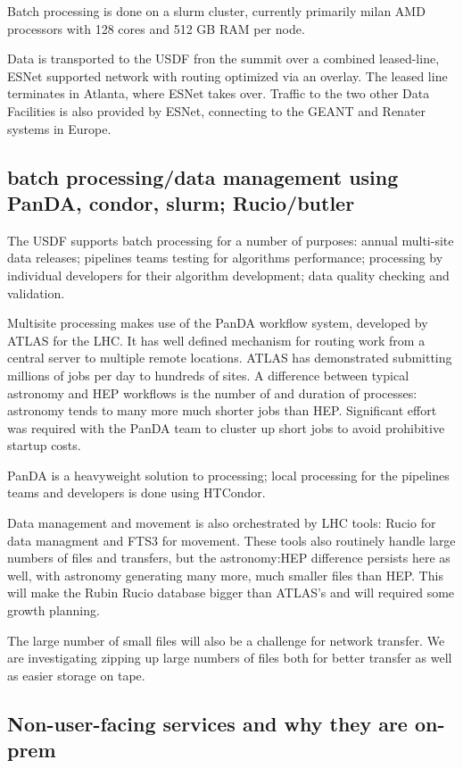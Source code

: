 Batch processing is done on a slurm cluster, currently primarily milan AMD
processors with 128 cores and 512 GB RAM per node.

Data is transported to the USDF fron the summit over a combined
leased-line, ESNet supported network with routing optimized via an
overlay. The leased line terminates in Atlanta, where ESNet takes
over. Traffic to the two other Data Facilities is also provided by
ESNet, connecting to the GEANT and Renater systems in Europe.

\subsection{batch processing/data management using PanDA, condor,
  slurm; Rucio/butler}

The USDF supports batch processing for a number of purposes: annual
multi-site data releases; pipelines teams testing for algorithms
performance; processing by individual developers for their algorithm
development; data quality checking and validation.

Multisite processing makes use of the PanDA workflow system, developed
by ATLAS for the LHC. It has well defined mechanism for routing work
from a central server to multiple remote locations. ATLAS has
demonstrated submitting millions of jobs per day to hundreds of
sites. A difference between typical astronomy and HEP workflows is the
number of and duration of processes: astronomy tends to many more much
shorter jobs than HEP. Significant effort was required with the PanDA
team to cluster up short jobs to avoid prohibitive startup costs.

PanDA is a heavyweight solution to processing; local processing for
the pipelines teams and developers is done using HTCondor.

Data management and movement is also orchestrated by LHC tools: Rucio
for data managment and FTS3 for movement. These tools also routinely
handle large numbers of files and transfers, but the astronomy:HEP
difference persists here as well, with astronomy generating many more,
much smaller files than HEP. This will make the Rubin Rucio database
bigger than ATLAS's and will required some growth planning.

The large number of small files will also be a challenge for network
transfer. We are investigating zipping up large numbers of files both
for better transfer as well as easier storage on tape.

\subsection{Non-user-facing services and why they are on-prem}

